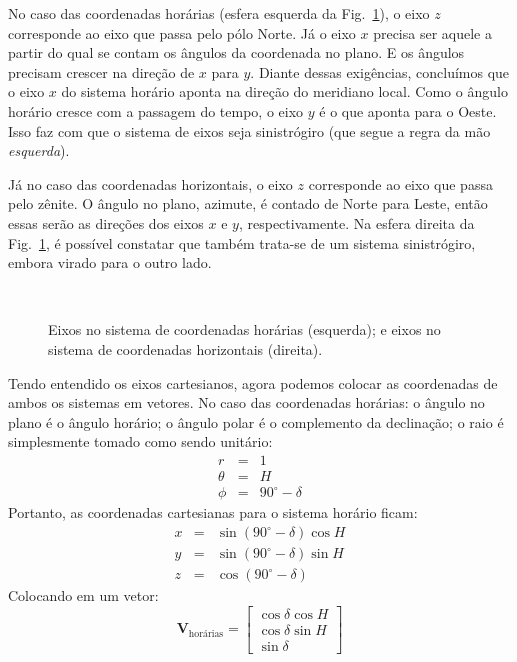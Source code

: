 No caso das coordenadas horárias (esfera esquerda da Fig.~\ref{fig:eixosh}), o eixo $z$ corresponde ao eixo que passa pelo pólo Norte. Já o eixo $x$ precisa ser aquele a partir do qual se contam os ângulos da coordenada no plano. E os ângulos precisam crescer na direção de $x$ para $y$. Diante dessas exigências, concluímos que o eixo $x$ do sistema horário aponta na direção do meridiano local. Como o ângulo horário cresce com a passagem do tempo, o eixo $y$ é o que aponta para o Oeste. Isso faz com que o sistema de eixos seja sinistrógiro (que segue a regra da mão \textit{esquerda}).

Já no caso das coordenadas horizontais, o eixo $z$ corresponde ao eixo que passa pelo zênite. O ângulo no plano, azimute, é contado de Norte para Leste, então essas serão as direções dos eixos $x$ e $y$, respectivamente. Na esfera direita da Fig.~\ref{fig:eixosh}, é possível constatar que também trata-se de um sistema sinistrógiro, embora virado para o outro lado.

\begin{figure}
\centering
~

\caption{Eixos no sistema de coordenadas horárias (esquerda); e eixos no sistema de coordenadas horizontais (direita).}
\label{fig:eixosh}
\end{figure}

Tendo entendido os eixos cartesianos, agora podemos colocar as coordenadas de ambos os sistemas em vetores. No caso das coordenadas horárias: o ângulo no plano é o ângulo horário; o ângulo polar é o complemento da declinação; o raio é simplesmente tomado como sendo unitário:
%
\begin{eqnarray}
r &=& 1 \\
\theta &=& H \\
\phi &=& 90^{\circ} - \delta
\end{eqnarray}
%
Portanto, as coordenadas cartesianas para o sistema horário ficam:
%
\begin{eqnarray}
x &=& \sin(90^{\circ} - \delta) \cos H \\
y &=& \sin(90^{\circ} - \delta) \sin H \\
z &=& \cos(90^{\circ} - \delta)
\end{eqnarray}
%
Colocando em um vetor:
%
\begin{equation}
\textbf{V}_\text{hor\'arias} =
\begin{bmatrix}
\cos \delta \cos H \\
\cos \delta \sin H \\
\sin \delta
\end{bmatrix}
\end{equation}

